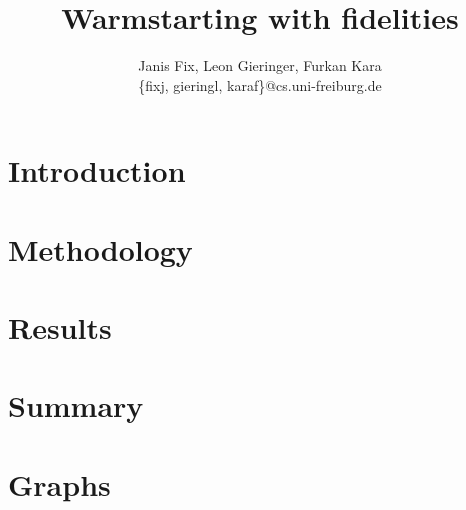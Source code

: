 \documentclass[10pt,onecolumn,letterpaper]{article}
\begin{document}
\title{Warmstarting with fidelities}

\author{Janis Fix, Leon Gieringer, Furkan Kara\\
{\small \{fixj, gieringl, karaf\}@cs.uni-freiburg.de}
}
\maketitle


\section{Introduction}
\label{sec:intro}


\section{Methodology}

\section{Results}


\clearpage
\section{Summary}

{\small


}
\clearpage
\appendix
\section{Graphs}

\end{document}
